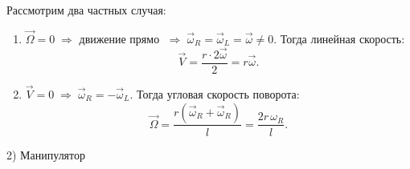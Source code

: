 \documentclass[12pt,a4paper]{report}
\begin{document}
\medskip
Рассмотрим два частных случая:

\begin{enumerate}
\item[а)] $\vec\Omega = 0 \;\Rightarrow$ движение прямо $\;\Rightarrow\; 
   \vec\omega_R = \vec\omega_L = \vec\omega \neq 0$.  
   Тогда линейная скорость:
   \[
   \vec V = \frac{r\cdot 2\vec\omega}{2} = r\vec\omega .
   \]

\item[б)] $\vec V = 0 \;\Rightarrow\; \vec\omega_R = -\vec\omega_L$.  
   Тогда угловая скорость поворота:
   \[
   \vec\Omega = \frac{r(\vec\omega_R + \vec\omega_R)}{l} 
              = \frac{2r\,\omega_R}{l}.
   \]
\end{enumerate}

2) Манипулятор
\end{document}
